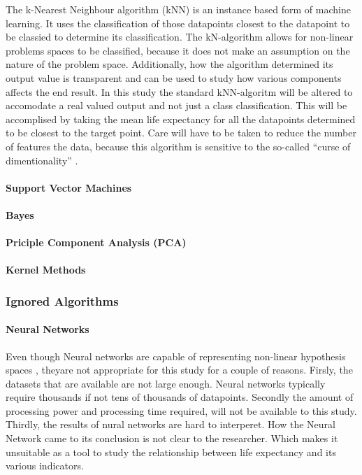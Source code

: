 \documentclass[12pt,a4paper]{article}
\begin{document}
The k-Nearest Neighbour algorithm (kNN) is an instance based form of machine learning. It uses the classification of those datapoints closest to the datapoint to be classied to determine its classification. The kN-algorithm allows for non-linear problems spaces to be classified, because it does not make an assumption on the nature of the problem space. Additionally, how the algorithm determined its output value is transparent and can be used to study how various components affects the end result. In this study the standard kNN-algoritm will be altered to accomodate a real valued output and not just a class classification. This will be accomplised by taking the mean life expectancy for all the datapoints determined to be closest to the target point. Care will have to be taken to reduce the number of features the data, because this algorithm is sensitive to the so-called ``curse of dimentionality'' \citep{Mitchell}.

\paragraph{Support Vector Machines}

\paragraph{Bayes}

\paragraph{Priciple Component Analysis (PCA)}
\cite{Duda2001}

\paragraph{Kernel Methods}
\cite{Alpaydin2010}

\subsubsection{Ignored Algorithms}
\paragraph{Neural Networks}
Even though Neural networks are capable of representing non-linear hypothesis spaces \citep{Mitchell}, theyare not appropriate for this study for a couple of reasons. Firsly, the datasets that are available are not large enough. Neural networks typically require thousands if not tens of thousands of datapoints. Secondly the amount of processing power and processing time required, will not be available to this study. Thirdly, the results of nural networks are hard to interperet. How the Neural Network came to its conclusion is not clear to the researcher. Which makes it unsuitable as a tool to study the relationship between life expectancy and its various indicators.
\end{document}
